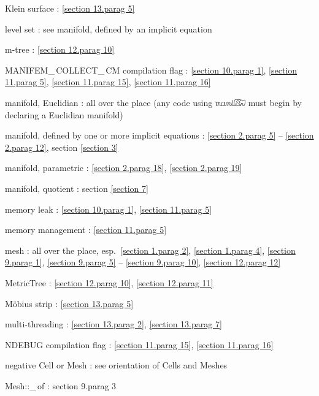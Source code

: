 \documentclass[a4paper,oneside]{scrbook}
\def\numb{}
\newcommand\maniFEM{\leavevmode\hbox{\includegraphics[width=13mm]{manifem-small}}}
\newcommand\verm[1]{\textcolor{manif}{#1}}
\renewcommand\tt{\normalfont\ttfamily}
\begin{document}
\noindent
Klein surface : \ref{\numb section 13.\numb parag 5}

\noindent
level set : see manifold, defined by an implicit equation

\noindent
m-tree : \ref{\numb section 12.\numb parag 10}

\noindent
{\small\tt MANIFEM\_\,COLLECT\_\,CM} compilation flag : \ref{\numb section 10.\numb parag 1},
\ref{\numb section 11.\numb parag 5}, \ref{\numb section 11.\numb parag 15},
\ref{\numb section 11.\numb parag 16}

\noindent
manifold, Euclidian : all over the place\hfil\break
\hglue 9mm (any code using {\maniFEM} must begin by declaring a Euclidian manifold)

\noindent
manifold, defined by one or more implicit equations :
\ref{\numb section 2.\numb parag 5} -- \ref{\numb section 2.\numb parag 12},
section \ref{\numb section 3}

\noindent
manifold, parametric : \ref{\numb section 2.\numb parag 18},
\ref{\numb section 2.\numb parag 19}

\noindent
manifold, quotient : section \ref{\numb section 7}

\noindent
memory leak : \ref{\numb section 10.\numb parag 1}, \ref{\numb section 11.\numb parag 5}

\noindent
memory management : \ref{\numb section 11.\numb parag 5}

\noindent
mesh : all over the place, esp.\ \ref{\numb section 1.\numb parag 2},
\ref{\numb section 1.\numb parag 4}, \ref{\numb section 9.\numb parag 1},
\ref{\numb section 9.\numb parag 5} -- \ref{\numb section 9.\numb parag 10},
\ref{\numb section 12.\numb parag 12}

\noindent
{\small\tt \verm{MetricTree}} : \ref{\numb section 12.\numb parag 10},
\ref{\numb section 12.\numb parag 11}

\noindent
M\"obius strip : \ref{\numb section 13.\numb parag 5}

\noindent
multi-threading : \ref{\numb section 13.\numb parag 2}, \ref{\numb section 13.\numb parag 7}

\noindent
{\small\tt NDEBUG} compilation flag : \ref{\numb section 11.\numb parag 15},
\ref{\numb section 11.\numb parag 16}

\noindent
negative {\small\tt \verm{Cell}} or {\small\tt \verm{Mesh}} :
see orientation of {\small\tt \verm{Cell}}s and {\small\tt \verm{Mesh}}es

\noindent
{\small\tt\verm{Mesh}::\_\,of} : {\numb section 9.\numb parag 3}
\end{document}
